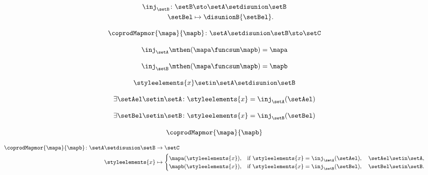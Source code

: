 \begin{forslides}
    \begin{equation}
        \label{eq:feedback-099}
        \begin{aligned}
            \inj_\setB\colon \setB & \sto \setA\setdisunion\setB \\
            \setBel                & \mapsto \disunionB{\setBel}.
        \end{aligned}    \end{equation}

    \begin{equation}
        \label{eq:feedback-100}
        \coprodMapmor{\mapa}{\mapb}\colon \setA \setdisunion \setB \sto \setC
    \end{equation}

    \begin{equation}
        \label{eq:feedback-101}
        \inj_\setA\mthen (\mapa \funcsum \mapb)=\mapa
    \end{equation}

    \begin{equation}
        \label{eq:feedback-102}
        \inj_\setB\mthen (\mapa \funcsum \mapb)=\mapb
    \end{equation}

    \begin{equation}
        \label{eq:feedback-103}
        \styleelements{x}\setin \setA \setdisunion \setB
    \end{equation}

    \begin{equation}
        \label{eq:feedback-104}
        \exists \setAel\setin \setA\colon \styleelements{x}=\inj_\setA(\setAel)
    \end{equation}

    \begin{equation}
        \label{eq:feedback-105}
        \exists \setBel\setin \setB\colon \styleelements{x}=\inj_\setB(\setBel)
    \end{equation}

    \begin{equation}
        \label{eq:feedback-106}
        \coprodMapmor{\mapa}{\mapb}
    \end{equation}

    \begin{equation}
        \label{eq:feedback-107}
        \begin{aligned}
            \coprodMapmor{\mapa}{\mapb} \colon  \setA \setdisunion \setB & \to \setC \\
            \styleelements{x}                                            & \mapsto
            \begin{cases}
                \mapa(\styleelements{x}), & \text{if } \styleelements{x}=\inj_\setA(\setAel),\quad \setAel \setin \setA, \\
                \mapb(\styleelements{x}), & \text{if } \styleelements{x}=\inj_\setB(\setBel),\quad \setBel \setin \setB.
            \end{cases}
        \end{aligned}
    \end{equation}


\end{forslides}
